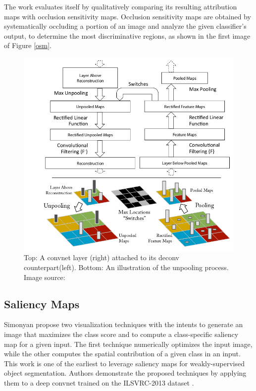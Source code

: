 \documentclass[../report.tex]{subfiles}
\begin{document}
    The work evaluates itself by qualitatively comparing its resulting attribution maps with occlusion sensitivity maps. Occlusion sensitivity maps are obtained by systematically occluding a portion of an image and analyze the given classifier’s output, to determine the most discriminative regions, as shown in the first image of Figure \ref{osm}.

    \begin{figure}[H]
    	\includegraphics[width=\textwidth]{images/chapter3/deconv_crop.png}
    	\caption[An illustration of deconvolution process]{Top: A convnet layer (right) attached to its deconv counterpart(left). Bottom: An illustration of the unpooling process. Image source: \cite{matthew2014visualizing}}
    	\label{fig_deconv}
    \end{figure}
    
    
 \subsection{Saliency Maps}
 \noindent
 Simonyan \etal \cite{simonyan2013deep} propose two visualization techniques with the intents to generate an image that maximizes the class score and to compute a class-specific saliency map for a given input. The first technique numerically optimizes the input image, while the other computes the spatial contribution of a given class in an input. This work is one of the earliest to leverage saliency maps for weakly-supervised object segmentation. Authors demonstrate the proposed techniques by applying them to a deep convnet trained on the ILSVRC-2013 dataset \cite{ILSVRC15}.
 
\end{document}
